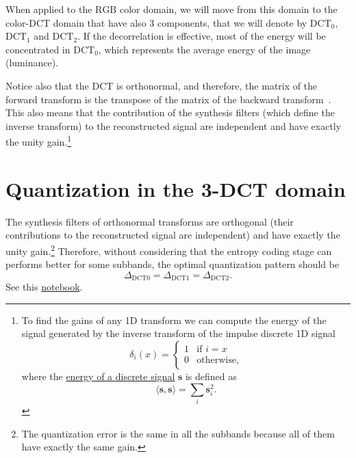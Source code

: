 When applied to the $\text{RGB}$ color domain, we will move from this
domain to the color-DCT domain that have also 3 components, that we
will denote by $\text{DCT}_0$, $\text{DCT}_1$ and $\text{DCT}_2$. If
the decorrelation is effective, most of the energy will be
concentrated in $\text{DCT}_0$, which represents the average energy of
the image (luminance).

Notice also that the DCT is orthonormal, and therefore, the matrix of
the forward transform is the transpose of the matrix of the backward
transform~\cite{sayood2017introduction}. This also means that the
contribution of the synthesis filters (which define the inverse
transform) to the reconstructed signal are independent and have
exactly the unity gain.\footnote{To find the gains of any 1D transform
we can compute the energy of the signal generated by the inverse
transform of the impulse discrete 1D signal
\begin{equation}
  \delta_{i}(x) = 
  \left\{
  \begin{array}{ll}
    1 & \text{if $i=x$}\\
    0 & \text{otherwise},
  \end{array}
  \right.
\end{equation}
where the
\href{https://en.wikipedia.org/wiki/Energy_(signal_processing)}{energy
  of a discrete signal} ${\mathbf s}$ is defined as
\begin{equation}
  \langle {\mathbf s}, {\mathbf s} \rangle =  \sum_{i}{{\mathbf s}_i^2}.
\end{equation}
}

\section{Quantization in the 3-DCT domain}
The synthesis filters of orthonormal transforms are orthogonal (their
contributions to the reconstructed signal are independent) and have
exactly the unity gain.\footnote{The quantization error is the same in
all the subbands because all of them have exactly the same gain.}
Therefore, without considering that the entropy coding stage can
performs better for some subbands, the optimal quantization pattern
should be
\begin{equation}
  \Delta_{\text{DCT0}} = \Delta_{\text{DCT1}} = \Delta_{\text{DCT2}}.
\end{equation}
See this \href{https://github.com/Sistemas-Multimedia/Sistemas-Multimedia.github.io/blob/master/study_guide/06-color_transform/color-DCT_compression.ipynb}{notebook}.

